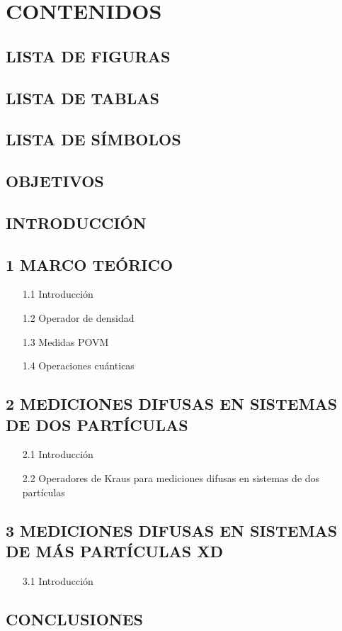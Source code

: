 \chapter{CONTENIDOS}

\section*{LISTA DE FIGURAS}

\section*{LISTA DE TABLAS}

\section*{LISTA DE SÍMBOLOS}

\section*{OBJETIVOS}

\section*{INTRODUCCIÓN}

\section*{1 MARCO TEÓRICO}
\begin{itemize}
\item[1.1] Introducción
\item[1.2] Operador de densidad
\item[1.3] Medidas POVM
\item[1.4] Operaciones cuánticas 
\end{itemize}

\section*{2 MEDICIONES DIFUSAS EN SISTEMAS DE DOS PARTÍCULAS}
\begin{itemize}
\item[2.1] Introducción
\item[2.2] Operadores de Kraus para mediciones difusas en sistemas de dos partículas
\end{itemize}

\section*{3 MEDICIONES DIFUSAS EN SISTEMAS DE MÁS PARTÍCULAS XD}
\begin{itemize}
\item[3.1] Introducción
\end{itemize}




\section*{CONCLUSIONES }